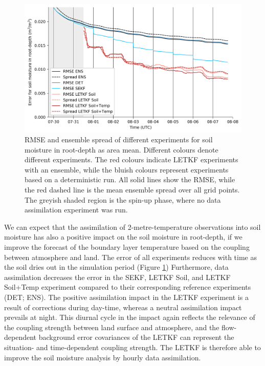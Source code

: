 \documentclass[hess, manuscript]{copernicus}
\begin{document}
\begin{figure}[ht]
	\includegraphics[width=\textwidth]{figures/fig_05_err_h2o_long.png}
	\caption{
		RMSE and ensemble spread of different experiments for soil moisture in root-depth as area mean.
		Different colours denote different experiments.
		The red colours indicate LETKF experiments with an ensemble, while the bluish colours represent experiments based on a deterministic run.
		All solid lines show the RMSE, while the red dashed line is the mean ensemble spread over all grid points.
		The greyish shaded region is the spin-up phase, where no data assimilation experiment was run.
	}
	\label{fig:err_h2o_long}
\end{figure}

We can expect that the assimilation of 2-metre-temperature observations into soil moisture has also a positive impact on the soil moisture in root-depth, if we improve the forecast of the boundary layer temperature based on the coupling between atmosphere and land.
The error of all experiments reduces with time as the soil dries out in the simulation period (Figure \ref{fig:err_h2o_long})
Furthermore, data assimilation decreases the error in the SEKF, LETKF Soil, and LETKF Soil+Temp experiment compared to their corresponding reference experiments (DET; ENS).
The positive assimilation impact in the LETKF experiment is a result of corrections during day-time, whereas a neutral assimilation impact prevails at night.
This diurnal cycle in the impact again reflects the relevance of the coupling strength between land surface and atmosphere, and the flow-dependent background error covariances of the LETKF can represent the situation- and time-dependent coupling strength.
The LETKF is therefore able to improve the soil moisture analysis by hourly data assimilation.
\end{document}
